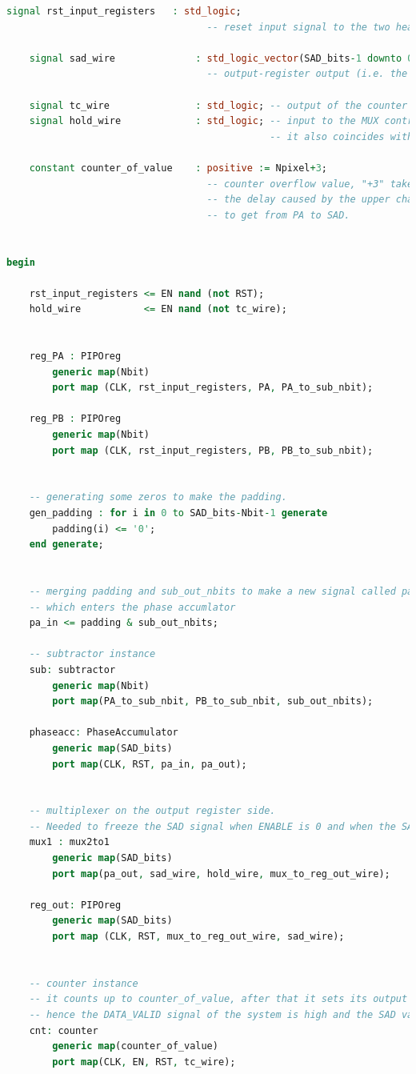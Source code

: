 \documentclass[12pt, a4paper]{article}
\begin{document}
\begin{appendices}
\begin{lstlisting}[language=vhdl]
	signal rst_input_registers   : std_logic;
                                   -- reset input signal to the two heading PIPO registers

	signal sad_wire              : std_logic_vector(SAD_bits-1 downto 0); 
                                   -- output-register output (i.e. the actual SAD signal)
	
	signal tc_wire               : std_logic; -- output of the counter
	signal hold_wire             : std_logic; -- input to the MUX control signal. 
	                                          -- it also coincides with DATA_VALID
	
	constant counter_of_value    : positive := Npixel+3; 
	                               -- counter overflow value, "+3" takes into account
	                               -- the delay caused by the upper chain, i.e.
	                               -- to get from PA to SAD.


begin
		
	rst_input_registers <= EN nand (not RST);
	hold_wire           <= EN nand (not tc_wire);


	reg_PA : PIPOreg
		generic map(Nbit)
		port map (CLK, rst_input_registers, PA, PA_to_sub_nbit);

	reg_PB : PIPOreg
		generic map(Nbit)
		port map (CLK, rst_input_registers, PB, PB_to_sub_nbit);


	-- generating some zeros to make the padding.
	gen_padding : for i in 0 to SAD_bits-Nbit-1 generate
		padding(i) <= '0';
	end generate;


	-- merging padding and sub_out_nbits to make a new signal called pa_in
	-- which enters the phase accumlator
	pa_in <= padding & sub_out_nbits;

	-- subtractor instance
	sub: subtractor
		generic map(Nbit)
		port map(PA_to_sub_nbit, PB_to_sub_nbit, sub_out_nbits);

	phaseacc: PhaseAccumulator
		generic map(SAD_bits)
		port map(CLK, RST, pa_in, pa_out);


	-- multiplexer on the output register side. 
	-- Needed to freeze the SAD signal when ENABLE is 0 and when the SAD computation is completed.
	mux1 : mux2to1
		generic map(SAD_bits)
		port map(pa_out, sad_wire, hold_wire, mux_to_reg_out_wire);

	reg_out: PIPOreg
		generic map(SAD_bits)
		port map (CLK, RST, mux_to_reg_out_wire, sad_wire);


	-- counter instance
	-- it counts up to counter_of_value, after that it sets its output to 1,
	-- hence the DATA_VALID signal of the system is high and the SAD value is frozen.
	cnt: counter
		generic map(counter_of_value)
		port map(CLK, EN, RST, tc_wire);


\end{lstlisting}
\end{appendices}
\end{document}
